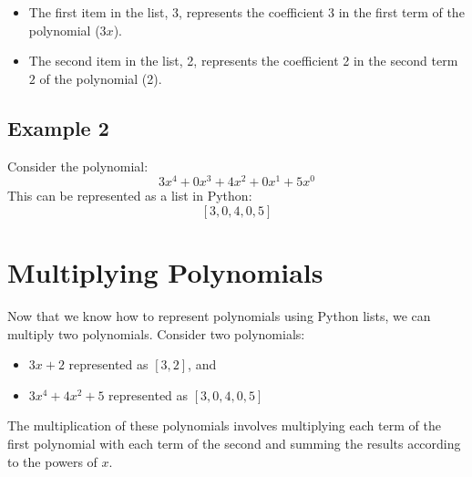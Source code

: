 \documentclass{article}
\begin{document}
\begin{itemize}
  \item The first item in the list, 3, represents the coefficient 3 in the first term of the polynomial (\( 3x \)).
  \item The second item in the list, 2, represents the coefficient 2 in the second term \( 2 \) of the polynomial (2).
\end{itemize}

\subsection*{Example 2}
Consider the polynomial:
$$ 3x^4 + 0x^3 + 4x^2 + 0x^1 + 5x^0 $$
This can be represented as a list in Python:
$$ [3, 0, 4, 0, 5] $$

\section*{Multiplying Polynomials}

Now that we know how to represent polynomials using Python lists, we can multiply two polynomials.
Consider two polynomials:
\begin{itemize}
  \item \( 3x + 2 \) represented as \([3, 2]\), and
  \item \( 3x^4 + 4x^2 + 5 \) represented as \([3, 0, 4, 0, 5]\)
\end{itemize}
The multiplication of these polynomials involves multiplying each term of the first polynomial with each term of the second and summing the results according to the powers of \( x \).
\end{document}
